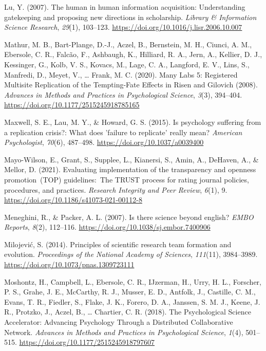 \documentclass[
  man,floatsintext]{apa7}
\newlength{\cslhangindent}
\newenvironment{CSLReferences}[2] %
 {\begin{list}{}{%
  \setlength{\itemindent}{0pt}
  \setlength{\leftmargin}{0pt}
  \setlength{\parsep}{0pt}
  \ifodd #1
   \setlength{\leftmargin}{\cslhangindent}
   \setlength{\itemindent}{-1\cslhangindent}
  \fi
  \setlength{\itemsep}{#2\baselineskip}}}
 {\end{list}}
\begin{document}
\begin{CSLReferences}{1}{0}
Lu, Y. (2007). The human in human information acquisition: Understanding gatekeeping and proposing new directions in scholarship. \emph{Library \& Information Science Research}, \emph{29}(1), 103--123. \url{https://doi.org/10.1016/j.lisr.2006.10.007}

Mathur, M. B., Bart-Plange, D.-J., Aczel, B., Bernstein, M. H., Ciunci, A. M., Ebersole, C. R., Falcão, F., Ashbaugh, K., Hilliard, R. A., Jern, A., Kellier, D. J., Kessinger, G., Kolb, V. S., Kovacs, M., Lage, C. A., Langford, E. V., Lins, S., Manfredi, D., Meyet, V., \ldots{} Frank, M. C. (2020). Many Labs 5: Registered Multisite Replication of the Tempting-Fate Effects in Risen and Gilovich (2008). \emph{Advances in Methods and Practices in Psychological Science}, \emph{3}(3), 394--404. \url{https://doi.org/10.1177/2515245918785165}

Maxwell, S. E., Lau, M. Y., \& Howard, G. S. (2015). Is psychology suffering from a replication crisis?: What does 'failure to replicate' really mean? \emph{American Psychologist}, \emph{70}(6), 487--498. \url{https://doi.org/10.1037/a0039400}

Mayo-Wilson, E., Grant, S., Supplee, L., Kianersi, S., Amin, A., DeHaven, A., \& Mellor, D. (2021). Evaluating implementation of the transparency and openness promotion~(TOP) guidelines:~The TRUST process for rating journal policies, procedures, and practices. \emph{Research Integrity and Peer Review}, \emph{6}(1), 9. \url{https://doi.org/10.1186/s41073-021-00112-8}

Meneghini, R., \& Packer, A. L. (2007). Is there science beyond english? \emph{EMBO Reports}, \emph{8}(2), 112--116. \url{https://doi.org/10.1038/sj.embor.7400906}

Milojević, S. (2014). Principles of scientific research team formation and evolution. \emph{Proceedings of the National Academy of Sciences}, \emph{111}(11), 3984--3989. \url{https://doi.org/10.1073/pnas.1309723111}

Moshontz, H., Campbell, L., Ebersole, C. R., IJzerman, H., Urry, H. L., Forscher, P. S., Grahe, J. E., McCarthy, R. J., Musser, E. D., Antfolk, J., Castille, C. M., Evans, T. R., Fiedler, S., Flake, J. K., Forero, D. A., Janssen, S. M. J., Keene, J. R., Protzko, J., Aczel, B., \ldots{} Chartier, C. R. (2018). The Psychological Science Accelerator: Advancing Psychology Through a Distributed Collaborative Network. \emph{Advances in Methods and Practices in Psychological Science}, \emph{1}(4), 501--515. \url{https://doi.org/10.1177/2515245918797607}


\end{CSLReferences}
\end{document}
